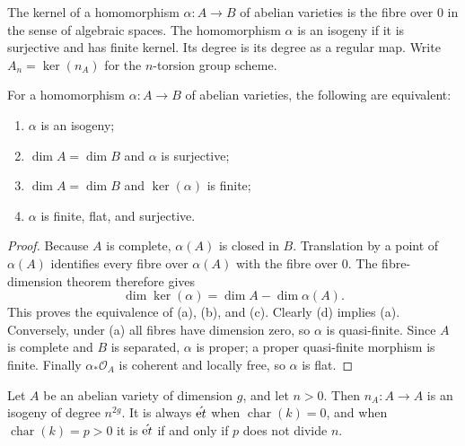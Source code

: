 \begin{definition}[Isogeny]
\label{def:milne-isogeny}

The kernel of a homomorphism $\alpha:A\to B$ of abelian varieties is the fibre
over $0$ in the sense of algebraic spaces.  The homomorphism $\alpha$ is an
isogeny if it is surjective and has finite kernel.  Its degree is its degree as
a regular map.  Write $A_n=\ker(n_A)$ for the $n$-torsion group scheme.
\end{definition}

\begin{proposition}
\label{prop:milne-isogeny-characterization}

For a homomorphism $\alpha:A\to B$ of abelian varieties, the following are
equivalent:
\begin{enumerate}
\item $\alpha$ is an isogeny;
\item $\dim A=\dim B$ and $\alpha$ is surjective;
\item $\dim A=\dim B$ and $\ker(\alpha)$ is finite;
\item $\alpha$ is finite, flat, and surjective.
\end{enumerate}
\end{proposition}

\begin{proof}
Because $A$ is complete, $\alpha(A)$ is closed in $B$.  Translation by a point
of $\alpha(A)$ identifies every fibre over $\alpha(A)$ with the fibre over
$0$.  The fibre-dimension theorem therefore gives
\[
 \dim\ker(\alpha)=\dim A-\dim\alpha(A).
\]
This proves the equivalence of (a), (b), and (c).  Clearly (d) implies (a).
Conversely, under (a) all fibres have dimension zero, so $\alpha$ is
quasi-finite.  Since $A$ is complete and $B$ is separated, $\alpha$ is proper;
a proper quasi-finite morphism is finite.  Finally $\alpha_*\mathcal O_A$ is
coherent and locally free, so $\alpha$ is flat.
\end{proof}

\begin{theorem}
\label{thm:milne-multiplication-degree}

Let $A$ be an abelian variety of dimension $g$, and let $n>0$.  Then
$n_A:A\to A$ is an isogeny of degree $n^{2g}$.  It is always $\acute{\mathrm{e}t}$ when
$\operatorname{char}(k)=0$, and when $\operatorname{char}(k)=p>0$ it is $\acute{\mathrm{e}t}$
if and only if $p$ does not divide $n$.
\end{theorem}

